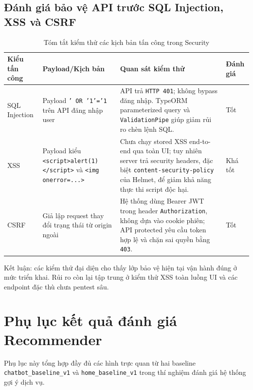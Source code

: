 \section{Đánh giá bảo vệ API trước SQL Injection, XSS và CSRF}
\begin{table}[H]
\centering
\small
\begin{tabularx}{\textwidth}{|>{\raggedright\arraybackslash}p{}|>{\raggedright\arraybackslash}X|>{\raggedright\arraybackslash}X|>{\centering\arraybackslash}p{}|}
\hline
\textbf{Kiểu tấn công} & \textbf{Payload/Kịch bản} & \textbf{Quan sát kiểm thử} & \textbf{Đánh giá} \\
\hline
SQL Injection & Payload \texttt{' OR '1'='1} trên API đăng nhập user & API trả \texttt{HTTP 401}; không bypass đăng nhập. TypeORM parameterized query và \texttt{ValidationPipe} giúp giảm rủi ro chèn lệnh SQL. & Tốt \\
\hline
XSS & Payload kiểu \newline \texttt{<script>alert(1)</script>} \newline và \texttt{<img onerror=...>} & Chưa chạy stored XSS end-to-end qua toàn UI; tuy nhiên server trả security headers, đặc biệt \texttt{content-security-policy} của Helmet, để giảm khả năng thực thi script độc hại. & Khá tốt \\
\hline
CSRF & Giả lập request thay đổi trạng thái từ origin ngoài & Hệ thống dùng Bearer JWT trong header \texttt{Authorization}, không dựa vào cookie phiên; API protected yêu cầu token hợp lệ và chặn sai quyền bằng \texttt{403}. & Tốt \\
\hline
\end{tabularx}
\caption{Tóm tắt kiểm thử các kịch bản tấn công trong Security}
\label{tab:security_attack_summary}
\end{table}

Kết luận: các kiểm thử đại diện cho thấy lớp bảo vệ hiện tại vận hành đúng ở mức triển khai. Rủi ro còn lại tập trung ở kiểm thử XSS toàn luồng UI và các endpoint đặc thù chưa pentest sâu.

\chapter{Phụ lục kết quả đánh giá Recommender}
\label{appendix:recommender_eval}

Phụ lục này tổng hợp đầy đủ các hình trực quan từ hai baseline \texttt{chatbot\_baseline\_v1} và \texttt{home\_baseline\_v1} trong thí nghiệm đánh giá hệ thống gợi ý dịch vụ.

